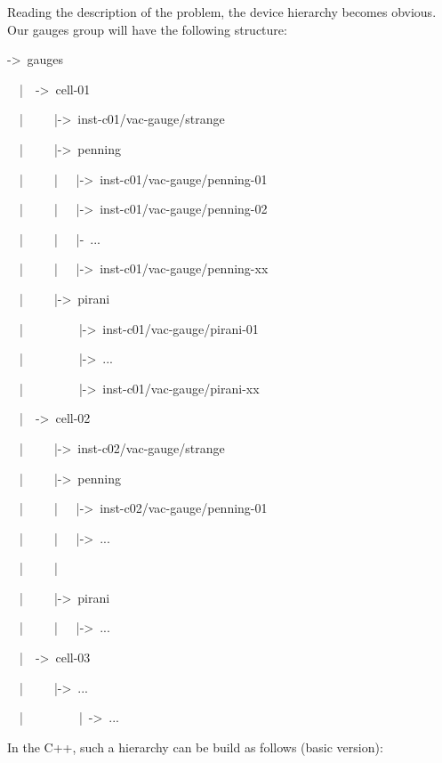 Reading the description of the problem, the device hierarchy becomes
obvious. Our \textquotedbl{}gauges\textquotedbl{} group will have
the following structure: 
\begin{lyxcode}
->~gauges

~~|~~->~cell-01

~~|~~~~~|->~inst-c01/vac-gauge/strange~

~~|~~~~~|->~penning~

~~|~~~~~|~~~|->~inst-c01/vac-gauge/penning-01~

~~|~~~~~|~~~|->~inst-c01/vac-gauge/penning-02~

~~|~~~~~|~~~|-~...~

~~|~~~~~|~~~|->~inst-c01/vac-gauge/penning-xx~

~~|~~~~~|->~pirani~

~~|~~~~~~~~~|->~inst-c01/vac-gauge/pirani-01

~~|~~~~~~~~~|->~...~

~~|~~~~~~~~~|->~inst-c01/vac-gauge/pirani-xx~

~~|~~->~cell-02

~~|~~~~~|->~inst-c02/vac-gauge/strange~

~~|~~~~~|->~penning~

~~|~~~~~|~~~|->~inst-c02/vac-gauge/penning-01~

~~|~~~~~|~~~|->~...~

~~|~~~~~|~

~~|~~~~~|->~pirani~

~~|~~~~~|~~~|->~...~

~~|~~->~cell-03~

~~|~~~~~|->~...~

~~|~~~~~~~~~|~->~...~
\end{lyxcode}
In the C++, such a hierarchy can be build as follows (basic version): 

